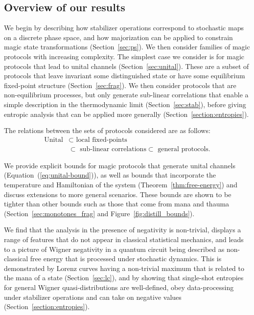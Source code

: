 \documentclass[pra,
aps,
twocolumn,
superscriptaddress,
groupedaddress,
nofootinbib,
reprint
]{revtex4-1}
\begin{document}
\subsection{Overview of our results}
We begin by describing how stabilizer operations correspond to stochastic maps on a discrete phase space, and how majorization can be applied to constrain magic state transformations (Section~\ref{sec:ps}). We then consider families of magic protocols with increasing complexity. The simplest case we consider is for magic protocols that lead to unital channels (Section~\ref{sec:unital}). These are a subset of protocols that leave invariant some distinguished state or have some equilibrium fixed-point structure (Section~\ref{sec:frag}). We then consider protocols that are non-equilibrium processes, but only generate sub-linear correlations that enable a simple description in the thermodynamic limit (Section~\ref{sec:stab}), before giving entropic analysis that can be applied more generally (Section~\ref{section:entropies}).

The relations between the sets of protocols considered are as follows:
\begin{align}
\mbox{Unital} &\subset \mbox{ local fixed-points} \nonumber\\ 
&\subset \mbox{ sub-linear correlations} \subset \mbox{ general protocols.} \nonumber
\end{align}

We provide explicit bounds for magic protocols that generate unital channels (Equation~(\ref{eq:unital-bound})), as well as bounds that incorporate the temperature and Hamiltonian of the system (Theorem~\ref{thm:free-energy}) and discuss extensions to more general scenarios. These bounds are shown to be tighter than other bounds such as those that come from mana and thauma (Section~\ref{sec:monotones_frag} and Figure~\ref{fig:distill_bounds}). 

We find that the analysis in the presence of negativity is non-trivial, displays a range of features that do not appear in classical statistical mechanics, and leads to a picture of Wigner negativity in a quantum circuit being described as non-classical free energy that is processed under stochastic dynamics. This is demonstrated by Lorenz curves having a non-trivial maximum that is related to the mana of a state (Section~\ref{sec:lc}), and by showing that single-shot entropies for general Wigner quasi-distributions are well-defined, obey data-processing under stabilizer operations and can take on negative values (Section~\ref{section:entropies}).
\end{document}
